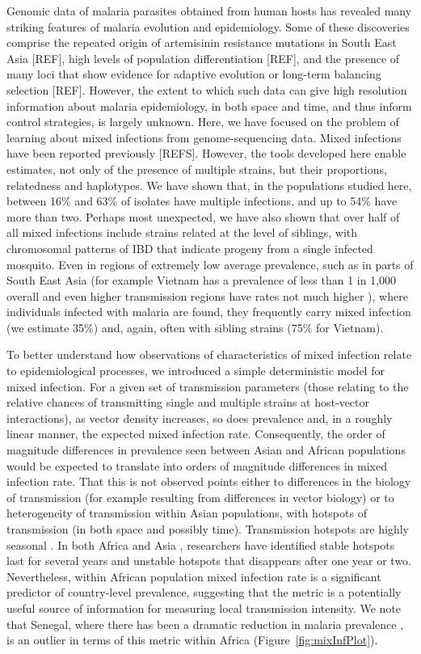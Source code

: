 \documentclass[9pt,lineno]{elife}
\begin{document}
Genomic data of malaria parasites obtained from human hosts has revealed many striking features of malaria evolution and epidemiology. Some of these discoveries comprise the repeated origin of artemisinin resistance mutations in South East Asia [REF], high levels of population differentiation [REF], and the presence of many loci that show evidence for adaptive evolution or long-term balancing selection [REF].  However, the extent to which such data can give high resolution information about malaria epidemiology, in both space and time, and thus inform control strategies, is largely unknown.  Here, we have focused on the problem of learning about mixed infections from genome-sequencing data.  Mixed infections have been reported previously [REFS].  However, the tools developed here enable estimates, not only of the presence of multiple strains, but their proportions, relatedness and haplotypes.  We have shown that, in the populations studied here, between 16\% and 63\% of isolates have multiple infections, and up to 54\% have more than two.  Perhaps most unexpected, we have also shown that over half of all mixed infections include strains related at the level of siblings, with chromosomal patterns of IBD that indicate progeny from a single infected mosquito.  Even in regions of extremely low average prevalence, such as in parts of South East Asia (for example Vietnam has a prevalence of less than 1 in 1,000 overall and even higher transmission regions have rates not much higher \citep{who2017, who2017profile}), where individuals infected with malaria are found, they frequently carry mixed infection (we estimate 35\%) and, again, often with sibling strains (75\% for Vietnam).

To better understand how observations of characteristics of mixed infection relate to epidemiological processes, we introduced a simple deterministic model for mixed infection.  For a given set of transmission parameters (those relating to the relative chances of transmitting single and multiple strains at host-vector interactions), as vector density increases, so does prevalence and, in a roughly linear manner, the expected mixed infection rate.  Consequently, the order of magnitude differences in prevalence seen between Asian and African populations would be expected to translate into orders of magnitude differences in mixed infection rate. That this is not observed points either to differences in the biology of transmission (for example resulting from differences in vector biology) or to heterogeneity of transmission within Asian populations, with hotspots of transmission (in both space and possibly time). Transmission hotspots are highly seasonal \citep{Ahmed2013}. In both Africa \citep{Bejon2010} and Asia \citep{Heng2017}, researchers have identified stable hotspots last for several years and unstable hotspots that disappears after one year or two. Nevertheless, within African population mixed infection rate is a significant predictor of country-level prevalence, suggesting that the metric is a potentially useful source of information for measuring local transmission intensity.  We note that Senegal, where there has been a dramatic reduction in malaria prevalence \citep{Daniels2015}, is an outlier in terms of this metric within Africa (Figure~\ref{fig:mixInfPlot}).
\end{document}
